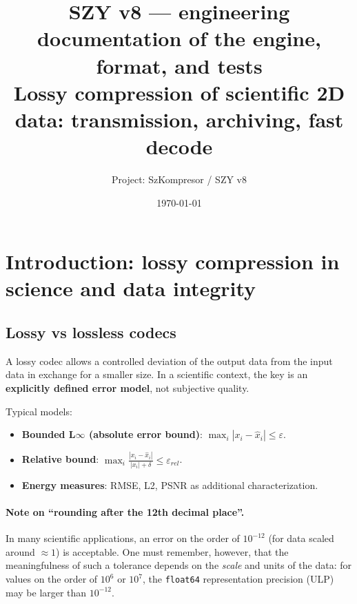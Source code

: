 \documentclass[11pt,a4paper]{article}
\title{SZY v8 --- engineering documentation of the engine, format, and tests\\
Lossy compression of scientific 2D data: transmission, archiving, fast decode}
\author{Project: SzKompresor / SZY v8}
\date{\today}
\begin{document}
\maketitle

\tableofcontents
\newpage

\section{Introduction: lossy compression in science and data integrity}

\subsection{Lossy vs lossless codecs}
A lossy codec allows a controlled deviation of the output data from the input data in exchange for a smaller size. In a scientific context, the key is an \textbf{explicitly defined error model}, not subjective quality.

Typical models:
\begin{itemize}
  \item \textbf{Bounded L$\infty$ (absolute error bound)}:
        $\max_i |x_i - \hat{x}_i| \le \varepsilon$.
  \item \textbf{Relative bound}:
        $\max_i \frac{|x_i - \hat{x}_i|}{|x_i|+\delta} \le \varepsilon_{rel}$.
  \item \textbf{Energy measures}: RMSE, L2, PSNR as additional characterization.
\end{itemize}

\paragraph{Note on ``rounding after the 12th decimal place''.}
In many scientific applications, an error on the order of $10^{-12}$ (for data scaled around $\approx 1$) is acceptable. One must remember, however, that the meaningfulness of such a tolerance depends on the \emph{scale} and units of the data: for values on the order of $10^6$ or $10^7$, the \texttt{float64} representation precision (ULP) may be larger than $10^{-12}$.
\end{document}
